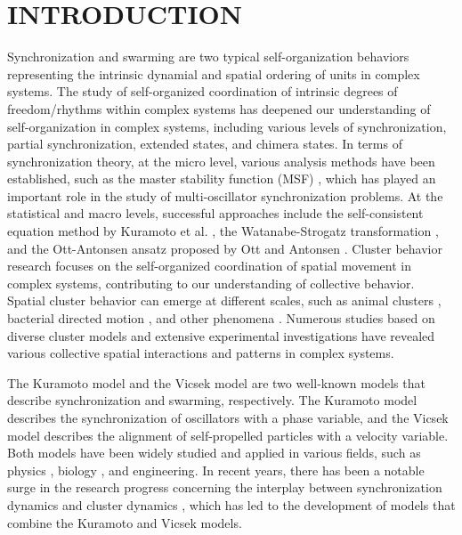 \documentclass[%
 aip,
 amsmath,amssymb,
 reprint,%
]{revtex4-1}
\begin{document}
\section{INTRODUCTION\protect\\ }
Synchronization and swarming are two typical self-organization behaviors representing the intrinsic dynamial and spatial ordering of units in complex systems.
The study of self-organized coordination of intrinsic degrees of freedom/rhythms within complex systems has deepened our understanding of self-organization in complex systems, including various levels of synchronization, partial synchronization, extended states, and chimera states\cite{pikovsky2001universal,acebron2005kuramoto,rodrigues2016kuramoto,boccaletti2018synchronization,zou2021quenching,arenas2008synchronization}.
In terms of synchronization theory, at the micro level, various analysis methods have been established, such as the master stability function (MSF) \cite{pecora1998master}, which has played an important role in the study of multi-oscillator synchronization problems. At the statistical and macro levels, successful approaches include the self-consistent equation method by Kuramoto et al. \cite{kuramoto1984chemical}, the Watanabe-Strogatz transformation \cite{watanabe1994constants,strogatz1988simple}, and the Ott-Antonsen ansatz proposed by Ott and Antonsen \cite{ott2009long}.
Cluster behavior research focuses on the self-organized coordination of spatial movement in complex systems, contributing to our understanding of collective behavior. Spatial cluster behavior can emerge at different scales, such as animal clusters \cite{buhl2006disorder,niven2012honeybees,bazazi2008collective}, bacterial directed motion \cite{wioland2016directed,lushi2014fluid}, and other phenomena \cite{zhang2010collective,shi2010understanding,debnath2016communication}. Numerous studies based on diverse cluster models and extensive experimental investigations \cite{vicsek1995novel,farrell2012pattern,nagai2015collective,grossmann2014vortex,chepizhko2013optimal,sumino2012large,yan2016reconfiguring} have revealed various collective spatial interactions and patterns in complex systems.

The Kuramoto model\cite{kuramoto1975international} and the Vicsek model\cite{vicsek1995novel} are two well-known models that describe synchronization and swarming, respectively. The Kuramoto model describes the synchronization of oscillators with a phase variable, and the Vicsek model describes the alignment of self-propelled particles with a velocity variable. Both models have been widely studied and applied in various fields, such as physics \cite{pantaleone1998stability,wiesenfeld1996synchronization}, biology \cite{aihara2008mathematical,o2016dynamics,neda2000physics,majhi2019emergence}, and engineering\cite{motter2019author,strogatz2005crowd,rohden2012self}.
In recent years, there has been a notable surge in the research progress concerning the interplay between synchronization dynamics and cluster dynamics \cite{o2017oscillators,kruk2018self,levis2019activity,ceron2023diverse,ling2022spatial}, which has led to the development of models that combine the Kuramoto and Vicsek models. 
\end{document}
